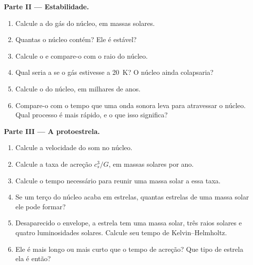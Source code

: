 \begin{problem}
\noindent\textbf{Parte II --- Estabilidade.}
\begin{enumerate}[resume]
  \item Calcule a  do gás do núcleo, em massas solares.
  \item Quantas  o núcleo contém? Ele é estável?
  \item Calcule o  e compare-o com o raio do núcleo.
  \item Qual seria a  se o gás estivesse a \qty{20}{K}? O
        núcleo ainda colapsaria?
  \item Calcule o  do núcleo, em milhares de anos.
  \item Compare-o com o tempo que uma onda sonora leva para atravessar o núcleo. Qual
        processo é mais rápido, e o que isso significa?
\end{enumerate}

\noindent\textbf{Parte III --- A protoestrela.}
\begin{enumerate}[resume]
  \item Calcule a velocidade do som no núcleo.
  \item Calcule a taxa de acreção $c_s^3/G$, em massas solares por ano.
  \item Calcule o tempo necessário para reunir uma massa solar a essa taxa.
  \item Se um terço do núcleo acaba em estrelas, quantas estrelas de uma massa solar
        ele pode formar?
  \item Desaparecido o envelope, a estrela tem uma massa solar, três raios
        solares e quatro luminosidades solares. Calcule seu tempo de Kelvin--Helmholtz.
  \item Ele é mais longo ou mais curto que o tempo de acreção? Que tipo de estrela
        ela é então?
\end{enumerate}


\end{problem}

